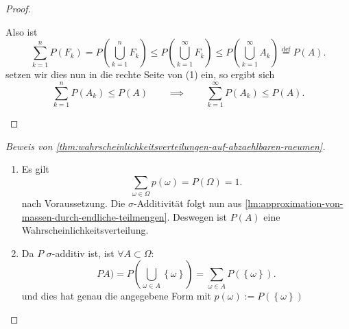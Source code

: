 \begin{proof}
\begin{enumerate}[label=\protect\circled{\alph*}]
\begin{enumerate}[1)]
\begin{equation}
                    \end{equation}
                    Also ist
                    \[
                        \sum_{k=1}^n P(F_k) = P\left( \bigcup_{k=1}^n F_k \right) \leq P\left( \bigcup_{k=1}^{\infty}F_k \right) \leq P\left( \bigcup_{k=1}^{\infty}A_k \right)  \stackrel{\text{def}}{=} P(A)
                    .\] 
                    setzen wir dies nun in die rechte Seite von (1) ein, so ergibt sich
                    \[
                        \sum_{k=1}^n P(A_k) \leq  P(A) \qquad \implies \qquad \sum_{k=1}^{\infty} P(A_k) \leq  P(A)
                    .\] 
            \end{enumerate}
    \end{enumerate}
\end{proof}
\begin{proof}[Beweis von \autoref{thm:wahrscheinlichkeitsverteilungen-auf-abzaehlbaren-raeumen}]
    \begin{enumerate}[label=\protect\circled{\alph*}]
        \item Es gilt
            \[
                \sum_{\omega\in \Omega}p(\omega) = P(\Omega) = 1
            .\] 
            nach Voraussetzung. Die $\sigma$-Additivität folgt nun aus \autoref{lm:approximation-von-massen-durch-endliche-teilmengen}. Deswegen ist $P(A)$ eine Wahrscheinlichkeitsverteilung.
        \item Da $P$ $\sigma$-additiv ist, ist $\forall A \subset \Omega$:
            \[
                PA) = P\left(\bigcup_{\omega\in A} \left \{\omega\right\} \right) = \sum_{\omega\in A} P(\left \{\omega\right\} )
            .\] 
            und dies hat genau die angegebene Form mit $p(\omega) := P(\left \{\omega\right\} )$
    \end{enumerate}
\end{proof}


